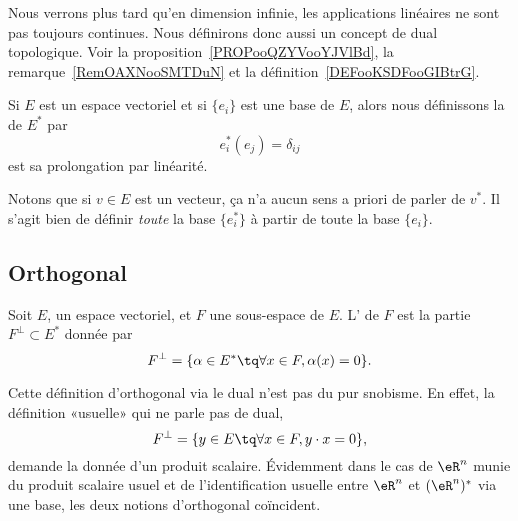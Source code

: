 Nous verrons plus tard qu'en dimension infinie, les applications linéaires ne sont pas toujours continues. Nous définirons donc aussi un concept de dual topologique. Voir la proposition~\ref{PROPooQZYVooYJVlBd}, la remarque~\ref{RemOAXNooSMTDuN} et la définition~\ref{DEFooKSDFooGIBtrG}.

\begin{definition}      \label{DEFooTMSEooZFtsqa}
    Si \( E\) est un espace vectoriel et si \( \{ e_i \}\) est une base de \( E\), alors nous définissons la  de \( E^*\) par
    \begin{equation}
        e_i^*(e_j)=\delta_{ij}
    \end{equation}
    est sa prolongation par linéarité.
\end{definition}
Notons que si \( v\in E\) est un vecteur, ça n'a aucun sens a priori de parler de \( v^*\). Il s'agit bien de définir \emph{toute} la base \( \{ e_i^* \}\) à partir de toute la base \( \{ e_i \}\).

\subsection{Orthogonal}

\begin{definition}      \label{DEFooEQSMooHVzbfz}
    Soit \( E\), un espace vectoriel, et \( F\) une sous-espace de \( E\). L' de \( F\) est la partie \( F^{\perp}\subset E^*\) donnée par
    \begin{equation}    \label{Eqiiyple}
        F^{\perp}=\{ \alpha\in E^*\tq \forall x\in F,\alpha(x)=0 \}.
    \end{equation}
\end{definition}

Cette définition d'orthogonal via le dual n'est pas du pur snobisme. En effet, la définition «usuelle» qui ne parle pas de dual,
\begin{equation}
    F^{\perp}=\{ y\in E\tq \forall x\in F,y\cdot x=0 \},
\end{equation}
demande la donnée d'un produit scalaire. Évidemment dans le cas de \( \eR^n\) munie du produit scalaire usuel et de l'identification usuelle entre \( \eR^n\) et \( (\eR^n)^*\) via une base, les deux notions d'orthogonal coïncident.

